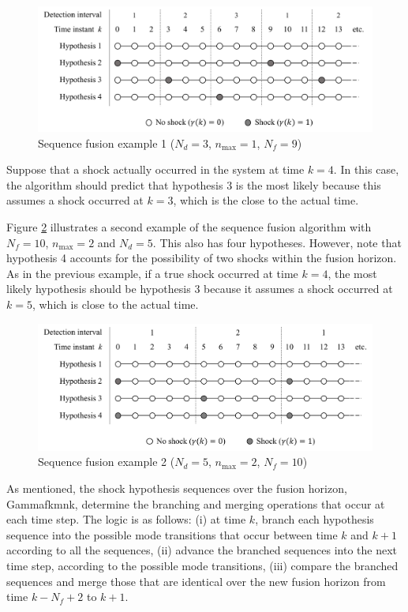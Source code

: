 \begin{figure}[htp]
	\centering
	\includegraphics[width=13cm]{images/mm_obs_seq_rob1.pdf}
	\caption{Sequence fusion example 1 ($N_d=3$, $n_\text{max}=1$, $N_f=9$)}
	\label{fig:mm-obs-seq-SFex1}
\end{figure}

Suppose that a shock actually occurred in the system at time $k=4$. In this case, the algorithm should predict that hypothesis 3 is the most likely because this assumes a shock occurred at $k=3$, which is the close to the actual time.

Figure \ref{fig:mm-obs-seq-SFex2} illustrates a second example of the sequence fusion algorithm with $N_f=10$, $n_\text{max}=2$ and $N_d=5$.  This also has four hypotheses. However, note that hypothesis 4 accounts for the possibility of two shocks within the fusion horizon. As in the previous example, if a true shock occurred at time $k=4$, the most likely hypothesis should be hypothesis 3 because it assumes a shock occurred at $k=5$, which is close to the actual time.

\begin{figure}[htp]
	\centering
	\includegraphics[width=13cm]{images/mm_obs_seq_rob2.pdf}
	\caption{Sequence fusion example 2 ($N_d=5$, $n_\text{max}=2$, $N_f=10$)}
	\label{fig:mm-obs-seq-SFex2}
\end{figure}

As mentioned, the shock hypothesis sequences over the fusion horizon, \gls{Gammafkmnk}, determine the branching and merging operations that occur at each time step. The logic is as follows: (i) at time $k$, branch each hypothesis sequence into the possible mode transitions that occur between time $k$ and $k+1$ according to all the sequences, (ii) advance the branched sequences into the next time step, according to the possible mode transitions, (iii) compare the branched sequences and merge those that are identical over the new fusion horizon from time $k-N_f+2$ to $k+1$.

